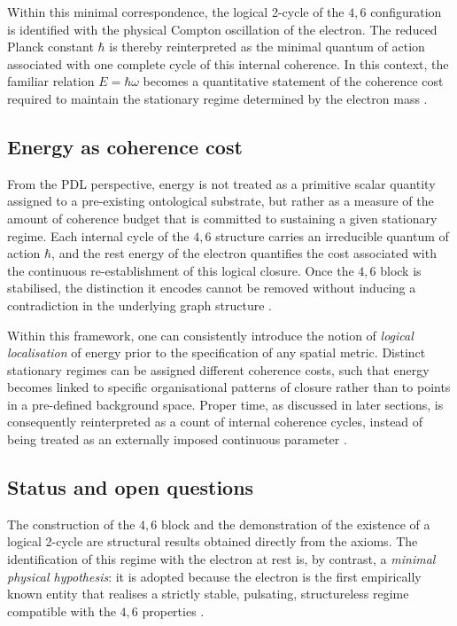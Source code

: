 \documentclass{article}
\begin{document}
Within this minimal correspondence, the logical 2-cycle of the \(4,6\) configuration is identified with the physical Compton oscillation of the electron. The reduced Planck constant \(\hbar\) is thereby reinterpreted as the minimal quantum of action associated with one complete cycle of this internal coherence. In this context, the familiar relation \(E = \hbar \omega\) becomes a quantitative statement of the coherence cost required to maintain the stationary regime determined by the electron mass \cite{PDL_Main_2026}.

\subsection{Energy as coherence cost}
\label{subsec:energy_coherence}

From the PDL perspective, energy is not treated as a primitive scalar quantity assigned to a pre-existing ontological substrate, but rather as a measure of the amount of coherence budget that is committed to sustaining a given stationary regime. Each internal cycle of the \(4,6\) structure carries an irreducible quantum of action \(\hbar\), and the rest energy of the electron quantifies the cost associated with the continuous re-establishment of this logical closure. Once the \(4,6\) block is stabilised, the distinction it encodes cannot be removed without inducing a contradiction in the underlying graph structure \cite{PDL_Main_2026,PDL_intro}.

Within this framework, one can consistently introduce the notion of \emph{logical localisation} of energy prior to the specification of any spatial metric. Distinct stationary regimes can be assigned different coherence costs, such that energy becomes linked to specific organisational patterns of closure rather than to points in a pre-defined background space. Proper time, as discussed in later sections, is consequently reinterpreted as a count of internal coherence cycles, instead of being treated as an externally imposed continuous parameter \cite{PDL_Main_2026,PDL_position}.

\subsection{Status and open questions}
\label{subsec:electron_status}

The construction of the \(4,6\) block and the demonstration of the existence of a logical 2-cycle are structural results obtained directly from the axioms. The identification of this regime with the electron at rest is, by contrast, a \emph{minimal physical hypothesis}: it is adopted because the electron is the first empirically known entity that realises a strictly stable, pulsating, structureless regime compatible with the \(4,6\) properties \cite{PDL_intro}.
\end{document}
